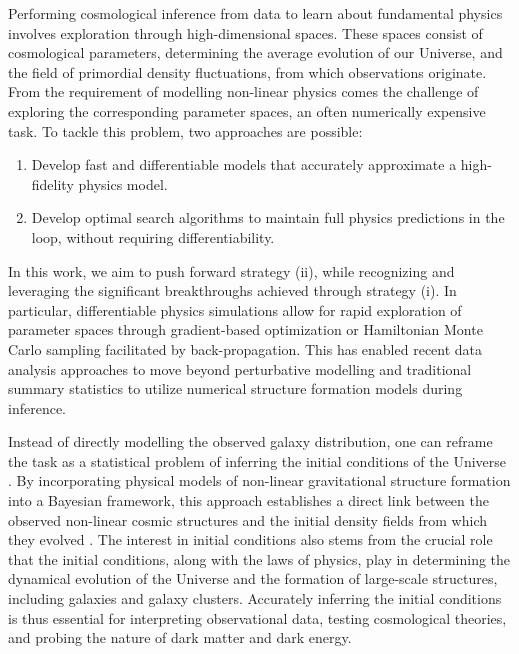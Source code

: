 Performing cosmological inference from data to learn about fundamental physics involves exploration through high-dimensional spaces. These spaces consist of cosmological parameters, determining the average evolution of our Universe, and the field of primordial density fluctuations, from which observations originate. From the requirement of modelling non-linear physics comes the challenge of exploring the corresponding parameter spaces, an often numerically expensive task. To tackle this problem, two approaches are possible:
\begin{enumerate}
    \item Develop fast and differentiable models that accurately approximate a high-fidelity physics model.
    \item Develop optimal search algorithms to maintain full physics predictions in the loop, without requiring differentiability.
\end{enumerate}
In this work, we aim to push forward strategy (ii), while recognizing and leveraging the significant breakthroughs achieved through strategy (i). In particular, differentiable physics simulations allow for rapid exploration of parameter spaces through gradient-based optimization or Hamiltonian Monte Carlo \citep[HMC,][]{Duane1987} sampling facilitated by back-propagation. This has enabled recent data analysis approaches to move beyond perturbative modelling and traditional summary statistics to utilize numerical structure formation models during inference.

Instead of directly modelling the observed galaxy distribution, one can reframe the task as a statistical problem of inferring the initial conditions of the Universe \citep{Jasche2012,Kitaura2013,Wang2014}. By incorporating physical models of non-linear gravitational structure formation into a Bayesian framework, this approach establishes a direct link between the observed non-linear cosmic structures and the initial density fields from which they evolved \citep{Jasche2019}. The interest in initial conditions also stems from the crucial role that the initial conditions, along with the laws of physics, play in determining the dynamical evolution of the Universe and the formation of large-scale structures, including galaxies and galaxy clusters. Accurately inferring the initial conditions is thus essential for interpreting observational data, testing cosmological theories, and probing the nature of dark matter and dark energy. 

